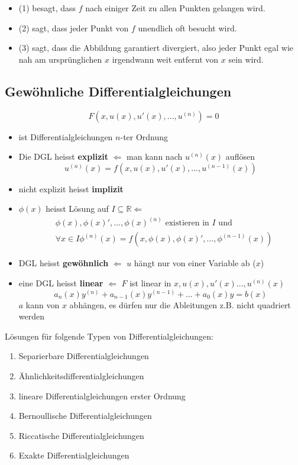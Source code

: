 \documentclass[a4paper]{article}
\newcommand{\R}{\mathbb{R}}
\begin{document}
\begin{itemize}
	\item (1) besagt, dass $f$ nach einiger Zeit zu allen Punkten
		gelangen wird.
	\item (2) sagt, dass jeder Punkt von $f$ unendlich oft besucht wird.
	\item (3) sagt, dass die Abbildung garantiert divergiert,
		also jeder Punkt egal wie nah am ursprünglichen $x$ irgendwann
		weit entfernt von $x$ sein wird.
\end{itemize}

\subsection{Gewöhnliche Differentialgleichungen}
\[
	F(x, u(x), u'(x), ..., u ^{(n)}) = 0
\] 
\begin{itemize}
	\item ist Differentialgleichungen $n$-ter Ordnung
	\item Die DGL heisst \textbf{explizit}
		$\Leftarrow$ man kann nach $u ^{(n)} (x)$ auflösen
		\[
			u ^{(n)} (x) =
			f(
				x,
				u(x),
				u'(x),
				...,
				u ^{(n-1)} (x)
			)
		\] 
	\item nicht explizit heisst \textbf{implizit} 
	\item $\phi (x)$ heisst Lösung auf $I \subseteq \R \Leftarrow$
		\begin{align*}
			& \phi(x),
			\phi(x)',
			...,
			\phi(x) ^{(n)}
			\text{ existieren in } I \text{ und } \\
			&
			\forall x \in I
			\phi ^{(n)} (x) =
			f(
				x,
				\phi(x),
				\phi(x)',
				...,
				\phi ^{(n-1)} (x)
			)
		\end{align*}
	\item DGL heisst \textbf{gewöhnlich} $\Leftarrow$
		$u$ hängt nur von einer Variable ab ($x$)
	\item eine DGL heisst \textbf{linear} $\Leftarrow$
		$F$ ist linear in $x, u(x), u'(x) ..., u ^{(n)} (x)$
		\[
			a_n (x) y ^{(n)} +
			a_{n-1} (x) y ^{(n-1)} +
			... + 
			a_{0} (x) y
			= b(x)
		\] 
		$a$ kann von $x$ abhängen, es dürfen nur die Ableitungen
		z.B. nicht quadriert werden
\end{itemize}

Lösungen für folgende Typen von Differentialgleichungen:
\begin{enumerate}
	\item Separierbare Differentialgleichungen
	\item Ähnlichkeitsdifferentialgleichungen
	\item lineare Differentialgleichungen erster Ordnung
	\item Bernoullische Differentialgleichungen
	\item Riccatische Differentialgleichungen
	\item Exakte Differentialgleichungen
\end{enumerate}
\end{document}
